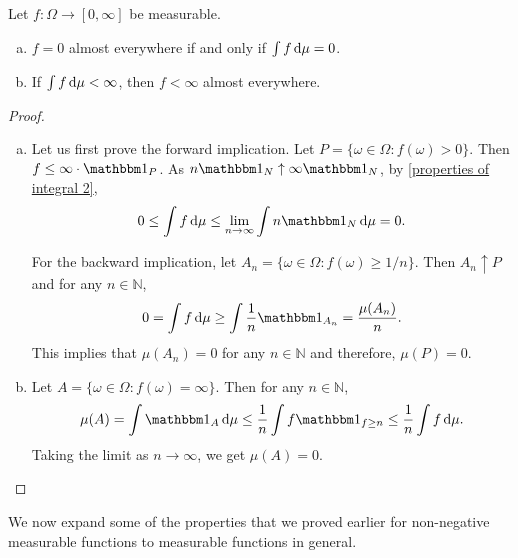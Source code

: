 \begin{theorem}
\label{properties of integral ae 1}
    Let $f:\Omega\to[0,\infty]$ be measurable.
    \begin{enumerate}[(a)]
        \item $f=0$ almost everywhere if and only if $\int f\operatorname{d}\!{\mu} = 0$.
        \item If $\int f\operatorname{d}\!{\mu}<\infty$, then $f<\infty$ almost everywhere.
    \end{enumerate}
\end{theorem}
\begin{proof}
    ~
    \begin{enumerate}[(a)]
        \item Let us first prove the forward implication. Let $P=\{\omega\in\Omega:f(\omega)>0\}$. Then $f\leq \infty\cdot\indic_{P}$. As $n\indic_{N}\uparrow\infty\indic_{N}$, by \cref{properties of integral 2},
        $$0\leq\int f\d{\mu}\leq\lim_{n\to\infty}\int n\indic_{N}\d{\mu}=0.$$
        
        For the backward implication, let $A_n=\{\omega\in\Omega:f(\omega)\geq 1/n\}$. Then $A_n\uparrow P$ and for any $n\in\mathbb{N}$,
        $$0=\int f\d{\mu} \geq \int \frac{1}{n}\indic_{A_n} = \frac{\mu(A_n)}{n}.$$
        This implies that $\mu(A_n)=0$ for any $n\in\mathbb{N}$ and therefore, $\mu(P)=0$.
        
        \item Let $A=\{\omega\in\Omega:f(\omega)=\infty\}$. Then for any $n\in\mathbb{N}$,
        $$\mu(A)=\int \indic_{A}\d{\mu}\leq \frac{1}{n}\int f\indic_{f\geq n}\leq \frac{1}{n} \int f\d{\mu}.$$
        Taking the limit as $n\to\infty$, we get $\mu(A)=0$.
    \end{enumerate}
\end{proof}

We now expand some of the properties that we proved earlier for non-negative measurable functions to measurable functions in general.

